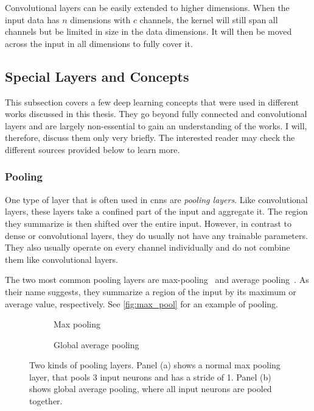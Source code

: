 Convolutional layers can be easily extended to higher dimensions. When the input data has $n$ dimensions with $c$ channels, the kernel will still span all channels but be limited in size in the data dimensions. It will then be moved across the input in all dimensions to fully cover it.


\subsection{Special Layers and Concepts}
This subsection covers a few deep learning concepts that were used in different works discussed in this thesis. They go beyond fully connected and convolutional layers and are largely non-essential to gain an understanding of the works. I will, therefore, discuss them only very briefly. The interested reader may check the different sources provided below to learn more.

\subsubsection{Pooling}
One type of layer that is often used in \acrshort{cnn}s are \emph{pooling layers}. Like convolutional layers, these layers take a confined part of the input and aggregate it. The region they summarize is then shifted over the entire input. However, in contrast to dense or convolutional layers, they do usually not have any trainable parameters. They also usually operate on every channel individually and do not combine them like convolutional layers.

The two most common pooling layers are max-pooling~\cite{Ranzato:2008aaa, Gholamalinezhad:2020aaa} and average pooling~\cite{LeCun:1989aaa}. As their name suggests, they summarize a region of the input by its maximum or average value, respectively. See \autoref{fig:max_pool} for an example of pooling.

\begin{figure}
	\centering
	\begin{subfigure}[b]{.3\linewidth}
		\resizebox{\linewidth}{!}{}
		\caption{Max pooling}\label{fig:max_pool}
	\end{subfigure}
	\hspace{0.2\linewidth}
	\begin{subfigure}[b]{.3\linewidth}
		\resizebox{\linewidth}{!}{}
		\caption{Global average pooling}\label{fig:global_pool}
	\end{subfigure}
	\caption[Pooling layers]{Two kinds of pooling layers. Panel (a) shows a normal max pooling layer, that pools 3 input neurons and has a stride of 1. Panel (b) shows global average pooling, where all input neurons are pooled together.}\label{fig:pooling}
\end{figure}

